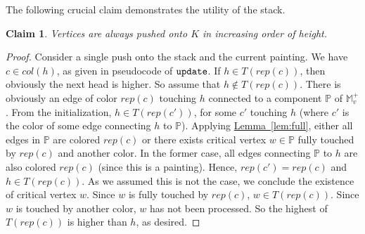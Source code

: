 \documentclass[11pt]{article}
\newcommand{\ignore}[1]{}
\newtheorem{claim}[theorem]{Claim}
\theoremstyle{definition}
\newcommand{\MM}{\mathbb{M}}
\newcommand{\PP}{\mathbb{P}}
\newcommand{\eps}{\varepsilon}
\newcommand{\Lem}[1]{\hyperref[lem:#1]{Lemma~\ref*{lem:#1}}} %
\newcommand{\col}{col}
\newcommand{\fcol}{full}
\newcommand{\rep}{rep}
\newcommand{\st}{K}
\newcommand{\update}{{\tt update}}
\begin{document}
The following crucial claim demonstrates the utility of the stack.

\begin{claim} \label{clm:stack} Vertices are always pushed onto $\st$ in increasing order of height.
\end{claim}

\begin{proof} Consider a single push onto the stack and the current painting. We have $c \in \col(h)$, as given in pseudocode of $\update$.
If $h \in T(\rep(c))$, then obviously the next head is higher. So assume that $h \notin T(\rep(c))$.
There is obviously an edge of color $\rep(c)$ touching $h$ connected to a component $\PP$ of $\MM^+_v$. 
From the initialization, $h \in T(\rep(c'))$, for some $c'$ touching $h$ (where $c'$ is the color
of some edge connecting $h$ to $\PP$).
Applying \Lem{full},  either all edges in $\PP$ are colored $\rep(c)$ or 
there exists critical vertex $w \in \PP$ fully touched by $\rep(c)$ and another color.
In the former case, all edges connecting $\PP$ to $h$ are also colored $\rep(c)$
(since this is a painting). Hence, $\rep(c') = \rep(c)$ and $h \in T(\rep(c))$.
As we assumed this is not the case, we conclude the existence of critical vertex $w$.
Since $w$ is fully touched by $\rep(c)$, $w \in T(\rep(c))$. Since $w$
is touched by another color, $w$ has not been processed. So the highest of $T(\rep(c))$
is higher than $h$, as desired.
\ignore{
If all edges touching $h$ that connect to this component are also colored $\rep(c)$, then
In Case (i), the increase in height is obvious.
Consider Case (ii). There is a vertex $v$ touched by color $c \notin \fcol(v)$. Consider the highest
vertex $w$ that is touched by $c$ and some other color. Clearly such a vertex exists, since the condition
is also satisfied by $v$. Take the $(f(w)+\delta)$-contour $\phi$ that intersects $B_\eps(v)$
and intersect some $c$-colored edge incident to $w$. Note that $\phi$ is also colored $c$,
since $w$ is the highest vertex to be touched by $c$ and some other color. (Take the path of $c$-colored
edges from the maximum to $w$. For any point on this path, the contour passing through this point must
be colored $c$.) Hence, $c \in \fcol(w)$ and $w \neq v$. Furthermore, $w$ is a critical point,
since $w$ is touched by another color. The corresponding edge cannot intersect $\phi$, so $w$
must have up-degree $2$.
All in all, when a new vertex is pushed onto the stack, it is always higher than the previous head.
}
\end{proof}
\end{document}
